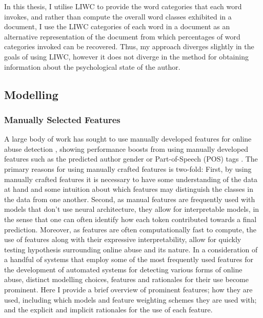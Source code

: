In this thesis, I utilise LIWC to provide the word categories that each word invokes, and rather than compute the overall word classes exhibited in a document, I use the LIWC categories of each word in a document as an alternative representation of the document from which percentages of word categories invoked can be recovered. Thus, my approach diverges slightly in the goals of using LIWC, however it does not diverge in the method for obtaining information about the psychological state of the author.

\subsection{Modelling}
\subsubsection{Manually Selected Features}

A large body of work has sought to use manually developed features for online abuse detection \citep{Davidson:2017,Waseem:2017,Ibrohim:2019,Vega:2019,Wiegand:2018,Tian:2020,Kumar:2019,Fortuna:2018}, showing performance boosts from using manually developed features such as the predicted author gender \citep{Waseem-Hovy:2016} or Part-of-Speech (POS) tags \citep{Davidson:2017}. The primary reasons for using manually crafted features is two-fold: First, by using manually crafted features it is necessary to have some understanding of the data at hand and some intuition about which features may distinguish the classes in the data from one another. Second, as manual features are frequently used with models that don't use neural architecture, they allow for interpretable models, in the sense that one can often identify how each token contributed towards a final prediction. Moreover, as features are often computationally fast to compute, the use of features along with their expressive interpretability, allow for quickly testing hypothesis surrounding online abuse and its nature.
In a consideration of a handful of systems that employ some of the most frequently used features for the development of automated systems for detecting various forms of online abuse, distinct modelling choices, features and rationales for their use become prominent. Here I provide a brief overview of prominent features; how they are used, including which models and feature weighting schemes they are used with; and the explicit and implicit rationales for the use of each feature.

